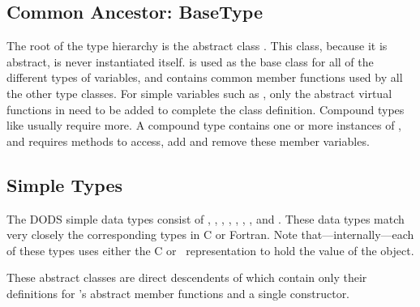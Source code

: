 \subsection{Common Ancestor: BaseType}

The root of the type hierarchy is the abstract class .
This class, because it is abstract, is never instantiated itself.
 is used as the base class for all of the different
types of variables, and contains common member functions used by all
the other type classes. For simple variables such as ,
only the abstract virtual functions in  need to be
added to complete the class definition. Compound types like
 usually require more. A compound type contains one
or more instances of , and requires methods to access,
add and remove these member variables.

\subsection{Simple Types}

The DODS simple data types consist of , ,
, , , ,
,  and . These data types match
very closely the corresponding types in C or Fortran.  Note
that---internally---each of these types uses either the C or \Cpp\ 
representation to hold the value of the object.

These abstract classes are direct descendents of 
which contain only their definitions for \class{BaseType}'s abstract
member functions and a single constructor.

